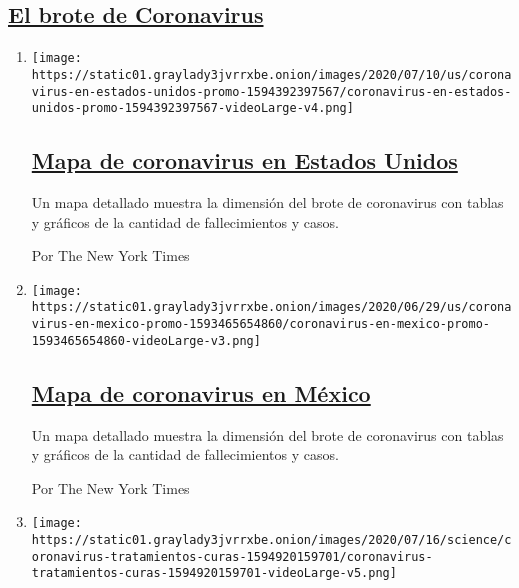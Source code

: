 \hypertarget{el-brote-de-coronavirus}{%
\subsection{\texorpdfstring{\protect\hyperlink{}{El brote de
Coronavirus}}{El brote de Coronavirus}}\label{el-brote-de-coronavirus}}

\begin{enumerate}
\def\labelenumi{\arabic{enumi}.}
\item
  \texttt{[image: https://static01.graylady3jvrrxbe.onion/images/2020/07/10/us/coronavirus-en-estados-unidos-promo-1594392397567/coronavirus-en-estados-unidos-promo-1594392397567-videoLarge-v4.png]}

  \hypertarget{mapa-de-coronavirus-en-estados-unidos}{%
  \subsection{\texorpdfstring{\href{/es/interactive/2020/espanol/mundo/coronavirus-en-estados-unidos.html}{Mapa
  de coronavirus en Estados
  Unidos}}{Mapa de coronavirus en Estados Unidos}}\label{mapa-de-coronavirus-en-estados-unidos}}

  Un mapa detallado muestra la dimensión del brote de coronavirus con
  tablas y gráficos de la cantidad de fallecimientos y casos.

  Por The New York Times
\item
  \texttt{[image: https://static01.graylady3jvrrxbe.onion/images/2020/06/29/us/coronavirus-en-mexico-promo-1593465654860/coronavirus-en-mexico-promo-1593465654860-videoLarge-v3.png]}

  \hypertarget{mapa-de-coronavirus-en-muxe9xico}{%
  \subsection{\texorpdfstring{\href{/es/interactive/2020/espanol/america-latina/coronavirus-en-mexico.html}{Mapa
  de coronavirus en
  México}}{Mapa de coronavirus en México}}\label{mapa-de-coronavirus-en-muxe9xico}}

  Un mapa detallado muestra la dimensión del brote de coronavirus con
  tablas y gráficos de la cantidad de fallecimientos y casos.

  Por The New York Times
\item
  \texttt{[image: https://static01.graylady3jvrrxbe.onion/images/2020/07/16/science/coronavirus-tratamientos-curas-1594920159701/coronavirus-tratamientos-curas-1594920159701-videoLarge-v5.png]}


\end{enumerate}
